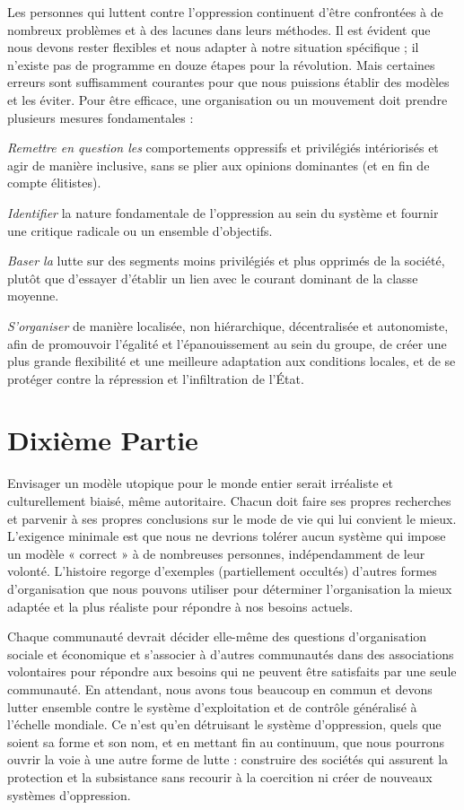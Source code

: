 Les personnes qui luttent contre l'oppression continuent d'être confrontées à de nombreux problèmes et à des lacunes dans leurs méthodes. Il est évident que nous devons rester flexibles et nous adapter à notre situation spécifique ; il n'existe pas de programme en douze étapes pour la révolution. Mais certaines erreurs sont suffisamment courantes pour que nous puissions établir des modèles et les éviter. Pour être efficace, une organisation ou un mouvement doit prendre plusieurs mesures fondamentales :

\emph{Remettre en question les} comportements oppressifs et privilégiés intériorisés et agir de manière inclusive, sans se plier aux opinions dominantes (et en fin de compte élitistes).

\emph{Identifier} la nature fondamentale de l'oppression au sein du système et fournir une critique radicale ou un ensemble d'objectifs.

\emph{Baser la} lutte sur des segments moins privilégiés et plus opprimés de la société, plutôt que d'essayer d'établir un lien avec le courant dominant de la classe moyenne.

\emph{S'organiser} de manière localisée, non hiérarchique, décentralisée et autonomiste, afin de promouvoir l'égalité et l'épanouissement au sein du groupe, de créer une plus grande flexibilité et une meilleure adaptation aux conditions locales, et de se protéger contre la répression et l'infiltration de l'État.

\chapter*{\textbf{Dixième Partie}}\hypertarget{dixime-partie}{}\label{dixime-partie}

Envisager un modèle utopique pour le monde entier serait irréaliste et culturellement biaisé, même autoritaire. Chacun doit faire ses propres recherches et parvenir à ses propres conclusions sur le mode de vie qui lui convient le mieux. L'exigence minimale est que nous ne devrions tolérer aucun système qui impose un modèle « correct » à de nombreuses personnes, indépendamment de leur volonté. L'histoire regorge d'exemples (partiellement occultés) d'autres formes d'organisation que nous pouvons utiliser pour déterminer l'organisation la mieux adaptée et la plus réaliste pour répondre à nos besoins actuels.

Chaque communauté devrait décider elle-même des questions d'organisation sociale et économique et s'associer à d'autres communautés dans des associations volontaires pour répondre aux besoins qui ne peuvent être satisfaits par une seule communauté. En attendant, nous avons tous beaucoup en commun et devons lutter ensemble contre le système d'exploitation et de contrôle généralisé à l'échelle mondiale. Ce n'est qu'en détruisant le système d'oppression, quels que soient sa forme et son nom, et en mettant fin au continuum, que nous pourrons ouvrir la voie à une autre forme de lutte : construire des sociétés qui assurent la protection et la subsistance sans recourir à la coercition ni créer de nouveaux systèmes d'oppression.


